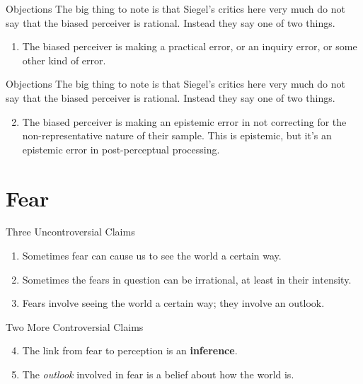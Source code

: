 \documentclass[
  17pt,
  letterpaper,
  ignorenonframetext,
  aspectratio=169,
  handout,
  xcolor={dvipsnames}]{beamer}
\providecommand{\tightlist}{%
  \setlength{\itemsep}{0pt}\setlength{\parskip}{0pt}}\usepackage{longtable,booktabs,array}
\begin{document}
\begin{frame}{Objections}
\protect\hypertarget{objections}{}
The big thing to note is that Siegel's critics here very much do not say
that the biased perceiver is rational. Instead they say one of two
things.

\begin{enumerate}[<+->]
\tightlist
\item
  The biased perceiver is making a practical error, or an inquiry error,
  or some other kind of error.
\end{enumerate}
\end{frame}

\begin{frame}{Objections}
\protect\hypertarget{objections-1}{}
The big thing to note is that Siegel's critics here very much do not say
that the biased perceiver is rational. Instead they say one of two
things.

\begin{enumerate}[<+->]
\setcounter{enumi}{1}
\tightlist
\item
  The biased perceiver is making an epistemic error in not correcting
  for the non-representative nature of their sample. This is epistemic,
  but it's an epistemic error in post-perceptual processing.
\end{enumerate}
\end{frame}

\hypertarget{fear}{%
\section{Fear}\label{fear}}

\begin{frame}{Three Uncontroversial Claims}
\protect\hypertarget{three-uncontroversial-claims}{}
\begin{enumerate}[<+->]
\tightlist
\item
  Sometimes fear can cause us to see the world a certain way.
\item
  Sometimes the fears in question can be irrational, at least in their
  intensity.
\item
  Fears involve seeing the world a certain way; they involve an outlook.
\end{enumerate}
\end{frame}

\begin{frame}{Two More Controversial Claims}
\protect\hypertarget{two-more-controversial-claims}{}
\begin{enumerate}[<+->]
\setcounter{enumi}{3}
\tightlist
\item
  The link from fear to perception is an \textbf{inference}.
\item
  The \emph{outlook} involved in fear is a belief about how the world
  is.
\end{enumerate}
\end{frame}
\end{document}
